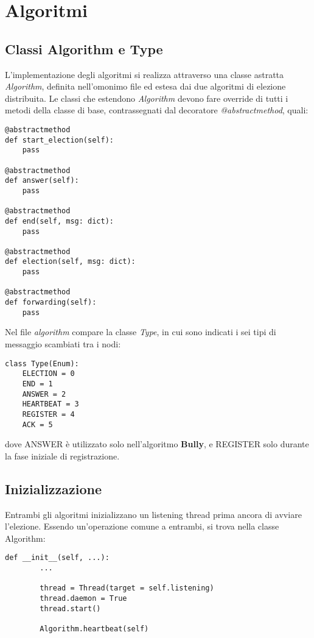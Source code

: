 \documentclass[conference]{IEEEtran}
\begin{document}
\section{Algoritmi}\label{sec:algo}


\subsection{Classi Algorithm e Type}\label{algorithm}

L'implementazione degli algoritmi si realizza attraverso una classe astratta \textit{Algorithm}, definita nell'omonimo file ed estesa dai due algoritmi di elezione distribuita.
Le classi che estendono \textit{Algorithm} devono fare override di tutti i metodi della classe di base, contrassegnati dal decoratore \textit{@abstractmethod}, quali:

\begin{lstlisting}
@abstractmethod
def start_election(self):
    pass

@abstractmethod
def answer(self):
    pass

@abstractmethod
def end(self, msg: dict):
    pass

@abstractmethod
def election(self, msg: dict):
    pass

@abstractmethod
def forwarding(self):
    pass
\end{lstlisting}

Nel file \textit{algorithm} compare la classe \textit{Type}, in cui sono indicati i sei tipi di messaggio scambiati tra i nodi:

\begin{lstlisting}
class Type(Enum):
    ELECTION = 0
    END = 1
    ANSWER = 2
    HEARTBEAT = 3
    REGISTER = 4
    ACK = 5
\end{lstlisting}

dove ANSWER è utilizzato solo nell'algoritmo \textbf{Bully}, e REGISTER solo durante la fase iniziale di registrazione.


\subsection{Inizializzazione}\label{init}

Entrambi gli algoritmi inizializzano un listening thread prima ancora di avviare l'elezione. Essendo un'operazione comune a entrambi, si trova nella classe Algorithm:

\begin{lstlisting}
def __init__(self, ...):
        ...
        
        thread = Thread(target = self.listening)
        thread.daemon = True
        thread.start()

        Algorithm.heartbeat(self)
\end{lstlisting}
\end{document}
